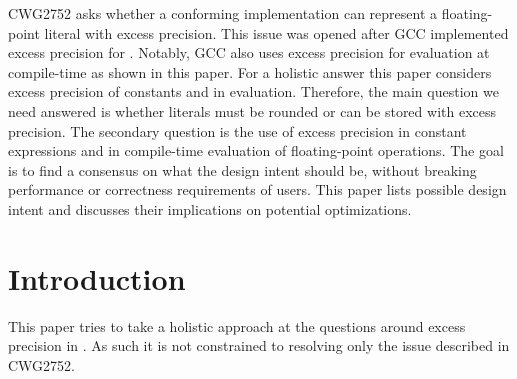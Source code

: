 \newcommand\wgTitle{Floating-Point Excess Precision}
\newcommand\wgName{Matthias Kretz <m.kretz@gsi.de>}
\newcommand\wgDocumentNumber{P3488R0}
\newcommand\wgGroup{SG6, EWG}
\newcommand\wgTarget{\CC{}26}

\usepackage{mymacros}
\usepackage{wg21}
\usepackage{changelog}
\usepackage{underscore}



\renewcommand{\lst}[1]{Listing~\ref{#1}}
\renewcommand{\sect}[1]{Section~\ref{#1}}
\renewcommand{\ttref}[1]{Tony~Table~\ref{#1}}
\newcommand\fp{floating-point\xspace}
\newcommand\Fp{Floating-point\xspace}
\newcommand\discussionref[1]{\hyperref[d:#1]{\color{Headings}$\rightarrow$ Discussion}}


\begin{wgTitlepage}
  CWG2752 asks whether a conforming implementation can represent a \fp literal
  with excess precision.
  This issue was opened after GCC implemented excess precision for \CC{}.
  Notably, GCC also uses excess precision for evaluation at compile-time as
  shown in this paper.
  For a holistic answer this paper considers excess precision of constants and
  in evaluation.
  Therefore, the main question we need answered is whether literals must be
  rounded or can be stored with excess precision.
  The secondary question is the use of excess precision in constant expressions
  and in compile-time evaluation of floating-point operations.
  The goal is to find a consensus on what the design intent should be, without
  breaking performance or correctness requirements of \CC{} users.
  This paper lists possible design intent and discusses their implications on
  potential optimizations.
\end{wgTitlepage}

\pagestyle{scrheadings}




\section{Introduction}

This paper tries to take a holistic approach at the questions around excess
precision in \CC{}.
As such it is not constrained to resolving only the issue described in CWG2752.

